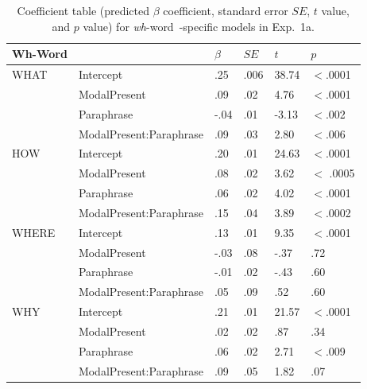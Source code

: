 \documentclass[12pt,letterpaper,table,svgnames,dvipsnames]{article}
\newcommand{\whw}{\emph{wh}-word~}
\begin{document}
\begin{table}[p!]
\begin{center} 
\caption{Coefficient table (predicted $\beta$ coefficient, standard error $SE$, $t$ value, and $p$ value) for \whw-specific models in Exp.~1a.} %
\label{sub-model_res_ex1a} 
\begin{tabular}{llllll} 
\toprule
\textbf{Wh-Word} & {} & $\beta$ & $SE$ & $t$ & $p$\\
\midrule
WHAT & Intercept & .25 & .006 & 38.74 & $<$.0001\\
{} & ModalPresent & .09 & .02 & 4.76 & $<$.0001\\
{} & Paraphrase & -.04 & .01 & -3.13 & $<$.002\\
{} & ModalPresent:Paraphrase & .09 & .03 & 2.80 & $<$.006\\
\midrule
HOW & Intercept & .20 & .01 & 24.63 & $<$.0001\\
{} & ModalPresent & .08 & .02 & 3.62 & $<$ .0005\\
{} & Paraphrase & .06 & .02 & 4.02 & $<$.0001\\
{} & ModalPresent:Paraphrase & .15 & .04 & 3.89 & $<$.0002\\
\midrule
WHERE & Intercept & .13 & .01 & 9.35 & $<$.0001\\
{} & ModalPresent & -.03 & .08 & -.37 & .72\\
{} & Paraphrase & -.01 & .02 & -.43 & .60\\
{} & ModalPresent:Paraphrase & .05 & .09 & .52 & .60\\
\midrule
WHY & Intercept & .21 & .01 & 21.57 & $<$.0001\\
{} & ModalPresent & .02 & .02 & .87 & .34\\
{} & Paraphrase & .06 & .02 & 2.71 & $<$.009\\
{} & ModalPresent:Paraphrase & .09 & .05 & 1.82 & .07\\

\end{tabular}
\end{center}
\end{table}
\end{document}
